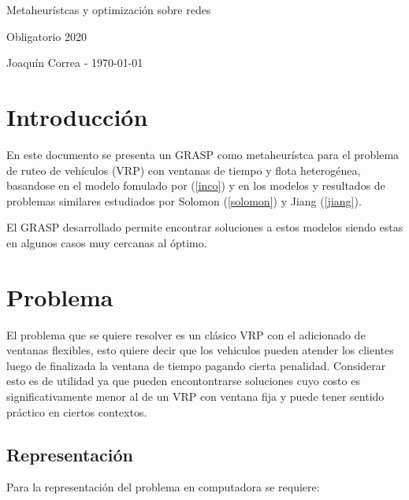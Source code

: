 \documentclass{article}
\begin{document}
  \begin{center}
    {\sc \large Metaheurístcas y optimización sobre redes}
    
    {\sc \large Obligatorio 2020}
    \linebreak

    {\rm Joaquín Correa - \today}
  \end{center}

  \section*{Introducción}

  En este documento se presenta un GRASP como metaheurístca para el problema de ruteo de vehículos (VRP) con ventanas de tiempo y flota heterogénea, basandose en el modelo fomulado por (\ref{inco}) y en los modelos y resultados de problemas similares estudiados por Solomon (\ref{solomon}) y Jiang (\ref{jiang}).

  El GRASP desarrollado permite encontrar soluciones a estos modelos siendo estas en algunos casos muy cercanas al óptimo.

  \section*{Problema}

  El problema que se quiere resolver es un clásico VRP con el adicionado de ventanas flexibles, esto quiere decir que los vehiculos pueden atender los clientes luego de finalizada la ventana de tiempo pagando cierta penalidad. Considerar esto es de utilidad ya que pueden encontontrarse soluciones cuyo costo es significativamente menor al de un VRP con ventana fija y puede tener sentido práctico en ciertos contextos.

  \subsection*{Representación}

  Para la representación del problema en computadora se requiere:
  
\end{document}
